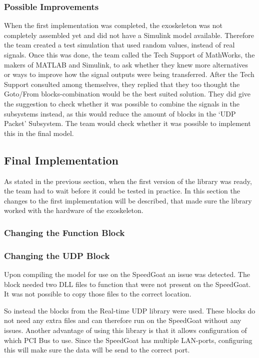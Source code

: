 \subsubsection{Possible Improvements}
When the first implementation was completed, the exoskeleton was not completely assembled yet and did not have a Simulink model available. Therefore the team created a test simulation that used random values, instead of real signals. Once this was done, the team called the Tech Support of MathWorks, the makers of MATLAB and Simulink, to ask whether they knew more alternatives or ways to improve how the signal outputs were being transferred. After the Tech Support consulted among themselves, they replied that they too thought the Goto/From blocks-combination would be the best suited solution. They did give the suggestion to check whether it was possible to combine the signals in the subsystems instead, as this would reduce the amount of blocks in the `UDP Packet' Subsystem. The team would check whether it was possible to implement this in the final model.

\subsection{Final Implementation}\label{sec:simfinim}
As stated in the previous section, when the first version of the library was ready, the team had to wait before it could be tested in practice. In this section the changes to the first implementation will be described, that made sure the library worked with the hardware of the exoskeleton.

\subsubsection{Changing the Function Block}



\subsubsection{Changing the UDP Block}
Upon compiling the model for use on the SpeedGoat an issue was detected. The block needed two DLL files to function that were not present on the SpeedGoat. It was not possible to copy those files to the correct location.

So instead the blocks from the Real-time UDP library were used. These blocks do not need any extra files and can therefore run on the SpeedGoat without any issues. Another advantage of using this library is that it allows configuration of which PCI Bus to use. Since the SpeedGoat has multiple LAN-ports, configuring this will make sure the data will be send to the correct port.

